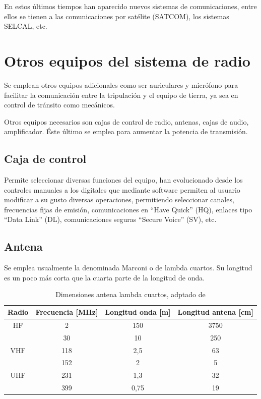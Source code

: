 En estos \'ultimos tiempos han aparecido nuevos sistemas de comunicaciones, entre ellos se tienen a las comunicaciones por sat\'elite (SATCOM), los sistemas SELCAL, etc.

\section{Otros equipos del sistema de radio}
\label{sec:09.02.otros.equipos.del.sistema.de.radio}

Se emplean otros equipos adicionales como ser auriculares y micr\'ofono para facilitar la comunicaci\'on entre la tripulaci\'on y el equipo de tierra, ya sea en control de tr\'ansito como mec\'anicos.

Otros equipos necesarios son cajas de control de radio, antenas, cajas de audio, amplificador. \'Este \'ultimo se emplea para aumentar la potencia de transmisi\'on.

\subsection{Caja de control}
\label{sec:09.02.01.caja.de.control}

Permite seleccionar diversas funciones del equipo, han evolucionado desde los controles manuales a los digitales que mediante software permiten al usuario  modificar a su gusto diversas operaciones, permitiendo seleccionar canales, frecuencias fijas de emisi\'on, comunicaciones en ``Have Quick'' (HQ), enlaces tipo ``Data Link'' (DL), comunicaciones seguras ``Secure Voice'' (SV), etc.

\subsection{Antena}
\label{sec:09.02.02.antena}

Se emplea usualmente la denominada Marconi o de lambda cuartos. Su longitud es un poco m\'as corta que la cuarta parte de la longitud de onda. 

\begin{table}[!h]
  \centering
  \caption{Dimensiones antena lambda cuartos, adptado de \protect\cite{martnez2006sistemas}}
  \label{tab:09.dimensiones.antena.lambda.cuartos}

  \begin{tabular}{cccc} \hline \rowcolor{cyan!20}
{\bf Radio} & {\bf Frecuencia [MHz]} & {\bf Longitud onda [m]} & {\bf Longitud antena [cm]} \\ \hline
HF & 2 & 150 & 3750 \\ 
& 30 & 10 & 250 \\ \hline
VHF & 118 & 2,5 & 63 \\ 
& 152 & 2 & 5 \\ \hline
UHF & 231 & 1,3 & 32 \\
& 399 & 0,75 & 19 \\ \hline
    
  \end{tabular}
\end{table}

